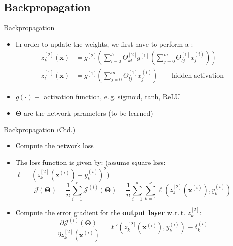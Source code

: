 \subsection{Backpropagation}

\begin{frame}{Backpropagation}{}\important
	\begin{itemize}
		\item In order to update the weights, we first have to perform a :
		\begin{align*}
			z_k^{[2]}(\bm{x})
				&= g^{[2]}\left( \sum_{l=0}^h \Theta_{kl}^{[2]} g^{[1]}\left( \sum_{j=0}^m \Theta_{lj}^{[1]} x_{j}^{(i)} \right) \right) \\
			z_l^{[1]}(\bm{x})
				&=  g^{[1]}\left( \sum_{j=0}^m \Theta_{lj}^{[1]} x_{j}^{(i)} \right) \qquad\text{hidden activation}
		\end{align*}
		\item $g(\cdot) \equiv$ activation function, e.\,g. sigmoid, tanh, ReLU
		\item $\bm{\Theta}$ are the network parameters (to be learned)
	\end{itemize}
\end{frame}


\begin{frame}[plain]{}{}
	
\end{frame}


\begin{frame}{Backpropagation (Ctd.)}{}\important
	\begin{itemize}
		\item Compute the network loss
		\item The loss function is given by: {\footnotesize(assume square loss: $\ell = (z_k^{[2]}(\bm{x}^{(i)}) - y_k^{(i)})^2$)}
		\begin{equation*}
			\mathcal{J}(\bm{\Theta}) = \frac{1}{n} \sum_{i=1}^n \mathcal{J}^{(i)}(\bm{\Theta}) = \frac{1}{n} \sum_{i=1}^n \sum_{k=1}^\kappa
				\ell(z_k^{[2]}(\bm{x}^{(i)}), y_k^{(i)})
		\end{equation*}
		\item Compute the error gradient for the \textbf{output layer} w.\,r.\,t. $z_k^{[2]}$:
		\begin{equation*}
			 \frac{\partial \mathcal{J}^{(i)}(\bm{\Theta})}{\partial z_k^{[2]}(\bm{x}^{(i)})}
			 	= \ell'(z_k^{[2]}(\bm{x}^{(i)}), y_k^{(i)}) \equiv \delta_k^{(i)}
		\end{equation*}
	\end{itemize}
\end{frame}


